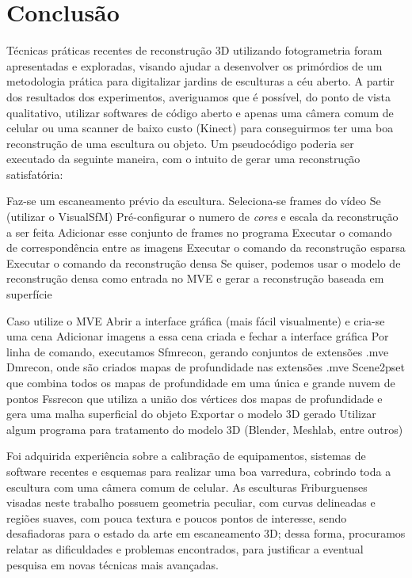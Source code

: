 \chapter{Conclusão}
Técnicas práticas recentes de reconstrução 3D utilizando fotogrametria foram
apresentadas e exploradas, visando
ajudar a desenvolver os primórdios de um metodologia prática para digitalizar jardins de esculturas a céu
aberto. A partir dos resultados dos experimentos, averiguamos que é possível, do ponto de vista qualitativo, utilizar softwares de código aberto e apenas uma câmera comum de celular ou uma scanner de baixo custo (Kinect) para conseguirmos ter uma boa reconstrução de uma escultura ou objeto. Um pseudocódigo poderia ser executado da seguinte maneira, com o intuito de gerar uma reconstrução satisfatória:

Faz-se um escaneamento prévio da escultura.
Seleciona-se frames do vídeo
Se (utilizar o VisualSfM) {
  Pré-configurar o numero de \emph{cores} e escala da reconstrução a ser feita
  Adicionar esse conjunto de frames no programa
  Executar o comando de correspondência entre as imagens
  Executar o comando da reconstrução esparsa
  Executar o comando da reconstrução densa
    Se quiser, podemos usar o modelo de reconstrução densa como entrada no MVE e gerar a reconstrução baseada em superfície
  }

Caso utilize o MVE {
  Abrir a interface gráfica (mais fácil visualmente) e cria-se uma cena
  Adicionar imagens a essa cena criada e fechar a interface gráfica
  Por linha de comando, executamos {
    Sfmrecon, gerando conjuntos de extensões .mve
    Dmrecon, onde são criados mapas de profundidade nas extensões .mve
    Scene2pset que combina todos os mapas de profundidade em uma única e grande nuvem de pontos
    Fssrecon que utiliza a união dos vértices dos mapas de profundidade e gera uma malha superficial do objeto
  }
Exportar o modelo 3D gerado
Utilizar algum programa para tratamento do modelo 3D (Blender, Meshlab, entre outros)
}


Foi adquirida experiência sobre a calibração de equipamentos, sistemas
de software recentes e esquemas para realizar uma boa varredura, cobrindo toda a
escultura com uma câmera comum de celular.  As esculturas Friburguenses visadas neste trabalho
possuem geometria peculiar, com curvas delineadas e regiões suaves, com pouca
textura e poucos pontos de interesse, sendo desafiadoras para o estado da arte
em escaneamento 3D; dessa forma, procuramos relatar as dificuldades e problemas
encontrados, para justificar a eventual pesquisa em novas técnicas mais
avançadas. 

